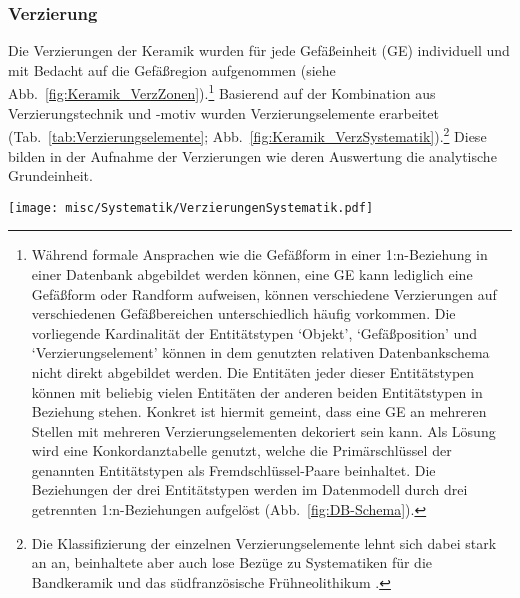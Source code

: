 \subsubsection{Verzierung}\label{sec:AufnahmeVerzierungen}

Die Verzierungen der Keramik wurden für jede Gefäßeinheit (GE) individuell und mit Bedacht auf die Gefäßregion aufgenommen (siehe Abb.~\ref{fig:Keramik_VerzZonen}).\footnote{Während formale Ansprachen wie die Gefäßform in einer 1:n-Beziehung in einer Datenbank abgebildet werden können, eine GE kann lediglich eine Gefäßform oder Randform aufweisen, können verschiedene Verzierungen auf verschiedenen Gefäßbereichen unterschiedlich häufig vorkommen. Die vorliegende Kardinalität der Entitätstypen \enquote*{Objekt}, \enquote*{Gefäßposition} und \enquote*{Verzierungselement} können in dem genutzten relativen Datenbankschema nicht direkt abgebildet werden. Die Entitäten jeder dieser Entitätstypen können mit beliebig vielen Entitäten der anderen beiden Entitätstypen in Beziehung stehen. Konkret ist hiermit gemeint, dass eine GE an mehreren Stellen mit mehreren Verzierungselementen dekoriert sein kann. Als Lösung wird eine Konkordanztabelle genutzt, welche die Primärschlüssel der genannten Entitätstypen als Fremdschlüssel-Paare beinhaltet. Die Beziehungen der drei Entitätstypen werden im Datenmodell durch drei getrennten 1:n-Beziehungen aufgelöst (Abb.~\ref{fig:DB-Schema}).} Basierend auf der Kombination aus Verzierungstechnik und -motiv wurden Verzierungselemente erarbeitet (Tab.~\ref{tab:Verzierungselemente}; Abb.~\ref{fig:Keramik_VerzSystematik}).\footnote{Die Klassifizierung der einzelnen Verzierungselemente lehnt sich dabei stark an \textcite{Wotzka.1995} an, beinhaltete aber auch lose Bezüge zu Systematiken für die Bandkeramik \parencites{Stehli.1973}{Stehli.1977}{Kneipp.1998} und das südfranzösische Frühneolithikum \parencites[126f. Abb.~3]{Manen.2002}[auch bei][]{Linstadter.2013}.} Diese bilden in der Aufnahme der Verzierungen wie deren Auswertung die analytische Grundeinheit.

\begin{figure*}[p]
 \centering
 \texttt{[image: misc/Systematik/VerzierungenSystematik.pdf]}
 \caption{Keramik: Verzierungstechniken, Verzierungswerkzeuge und Verzierungselemente.}
 \label{fig:Keramik_VerzSystematik}
\end{figure*}

\afterpage{%
\clearpage
{\small }
}

